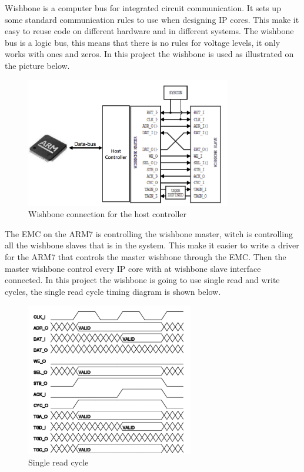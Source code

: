 Wishbone is a computer bus for integrated circuit communication. It sets up some standard communication rules to use when designing IP cores. This make it easy to reuse code on different hardware and in different systems. The wishbone bus is a logic bus, this means that there is no rules for voltage levels, it only works with ones and zeros. In this project the wishbone is used as illustrated on the picture below.
\begin{figure}[H]
	\begin{centering}
		 \includegraphics[width=0.8\textwidth]{images/typical_usage.png}
		\caption{Wishbone connection for the host controller}
	\end{centering}
\end{figure}
The EMC on the ARM7 is controlling the wishbone master, witch is controlling all the wishbone slaves that is in the system. This make it easier to write a driver for the ARM7 that controls the master wishbone through the EMC. Then the master wishbone control every IP core with at wishbone slave interface connected. In this project the wishbone is going to use single read and write cycles, the single read cycle timing diagram is shown below.
\begin{figure}[H]
	\begin{centering}
		 \includegraphics[width=0.65\textwidth]{images/wb_single_read.png}
		\caption{Single read cycle}
	\end{centering}
\end{figure}
